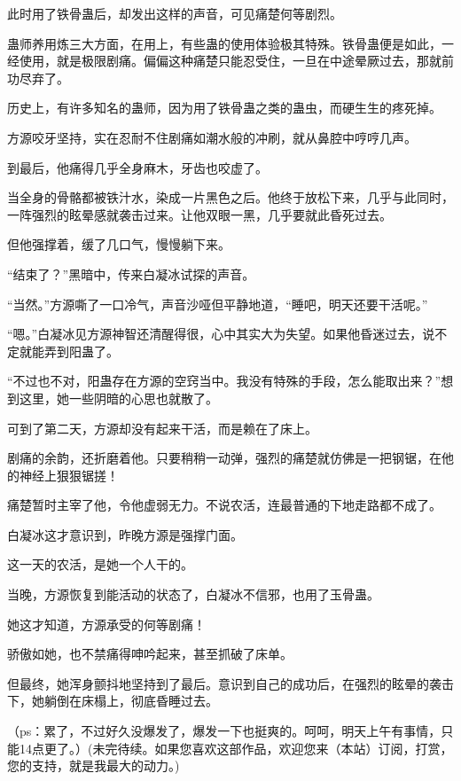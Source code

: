 \begin{this_body}
此时用了铁骨蛊后，却发出这样的声音，可见痛楚何等剧烈。

蛊师养用炼三大方面，在用上，有些蛊的使用体验极其特殊。铁骨蛊便是如此，一经使用，就是极限剧痛。偏偏这种痛楚只能忍受住，一旦在中途晕厥过去，那就前功尽弃了。

历史上，有许多知名的蛊师，因为用了铁骨蛊之类的蛊虫，而硬生生的疼死掉。

方源咬牙坚持，实在忍耐不住剧痛如潮水般的冲刷，就从鼻腔中哼哼几声。

到最后，他痛得几乎全身麻木，牙齿也咬虚了。

当全身的骨骼都被铁汁水，染成一片黑色之后。他终于放松下来，几乎与此同时，一阵强烈的眩晕感就袭击过来。让他双眼一黑，几乎要就此昏死过去。

但他强撑着，缓了几口气，慢慢躺下来。

“结束了？”黑暗中，传来白凝冰试探的声音。

“当然。”方源嘶了一口冷气，声音沙哑但平静地道，“睡吧，明天还要干活呢。”

“嗯。”白凝冰见方源神智还清醒得很，心中其实大为失望。如果他昏迷过去，说不定就能弄到阳蛊了。

“不过也不对，阳蛊存在方源的空窍当中。我没有特殊的手段，怎么能取出来？”想到这里，她一些阴暗的心思也就散了。

可到了第二天，方源却没有起来干活，而是赖在了床上。

剧痛的余韵，还折磨着他。只要稍稍一动弹，强烈的痛楚就仿佛是一把钢锯，在他的神经上狠狠锯搓！

痛楚暂时主宰了他，令他虚弱无力。不说农活，连最普通的下地走路都不成了。

白凝冰这才意识到，昨晚方源是强撑门面。

这一天的农活，是她一个人干的。

当晚，方源恢复到能活动的状态了，白凝冰不信邪，也用了玉骨蛊。

她这才知道，方源承受的何等剧痛！

骄傲如她，也不禁痛得呻吟起来，甚至抓破了床单。

但最终，她浑身颤抖地坚持到了最后。意识到自己的成功后，在强烈的眩晕的袭击下，她躺倒在床榻上，彻底昏睡过去。

（ps：累了，不过好久没爆发了，爆发一下也挺爽的。呵呵，明天上午有事情，只能14点更了。）(未完待续。如果您喜欢这部作品，欢迎您来（本站）订阅，打赏，您的支持，就是我最大的动力。)

\end{this_body}

